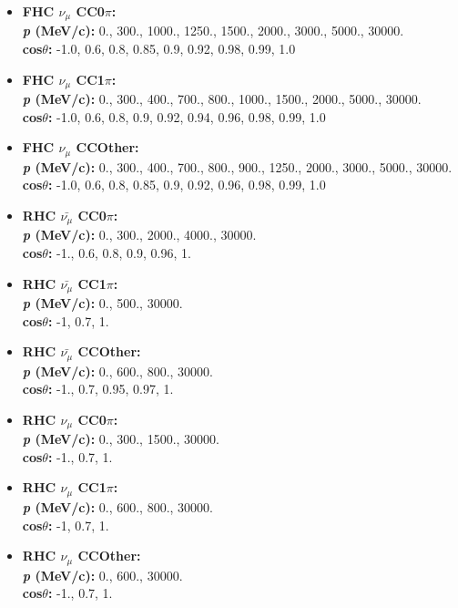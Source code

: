 \begin{itemize}
\setlength\itemsep{1mm}
\item \textbf{FHC $\nu_{\mu}$ CC0$\pi$:}\\
\textbf{\textit{p} (MeV/c):} 0., 300., 1000., 1250., 1500., 2000., 3000., 5000., 30000.\\
\textbf{cos$\theta$:} -1.0, 0.6, 0.8, 0.85, 0.9, 0.92, 0.98, 0.99, 1.0

\item \textbf{FHC $\nu_{\mu}$ CC1$\pi$:}\\
\textbf{\textit{p} (MeV/c):} 0., 300., 400., 700., 800., 1000., 1500., 2000., 5000., 30000.\\
\textbf{cos$\theta$:} -1.0, 0.6, 0.8, 0.9, 0.92, 0.94, 0.96, 0.98, 0.99, 1.0

\item \textbf{FHC $\nu_{\mu}$ CCOther:} \\
\textbf{\textit{p} (MeV/c):} 0., 300., 400., 700., 800., 900., 1250., 2000., 3000., 5000., 30000.\\
\textbf{cos$\theta$:} -1.0, 0.6, 0.8, 0.85, 0.9, 0.92, 0.96, 0.98, 0.99, 1.0

\item \textbf{RHC $\bar{\nu_{\mu}}$ CC0$\pi$:}\\
\textbf{\textit{p} (MeV/c):} 0., 300., 2000., 4000., 30000.\\
\textbf{cos$\theta$:} -1., 0.6, 0.8, 0.9, 0.96, 1.

\item \textbf{RHC $\bar{\nu_{\mu}}$ CC1$\pi$:}\\
\textbf{\textit{p} (MeV/c):} 0., 500., 30000.\\
\textbf{cos$\theta$:} -1, 0.7, 1.

\item \textbf{RHC $\bar{\nu_{\mu}}$ CCOther:}\\
\textbf{\textit{p} (MeV/c):} 0., 600., 800., 30000.\\
\textbf{cos$\theta$:} -1., 0.7, 0.95, 0.97, 1.

\item \textbf{RHC $\nu_{\mu}$ CC0$\pi$:}\\
\textbf{\textit{p} (MeV/c):} 0., 300., 1500., 30000.\\
\textbf{cos$\theta$:} -1., 0.7, 1.

\item \textbf{RHC $\nu_{\mu}$ CC1$\pi$:}\\
\textbf{\textit{p} (MeV/c):} 0., 600., 800., 30000.\\
\textbf{cos$\theta$:} -1, 0.7, 1.

\item \textbf{RHC $\nu_{\mu}$ CCOther:}\\
\textbf{\textit{p} (MeV/c):} 0., 600., 30000.\\
\textbf{cos$\theta$:} -1., 0.7, 1.

\end{itemize}

